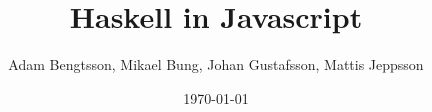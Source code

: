 \documentclass[a4paper, 12pt]{article}
\begin{document}
    \title{Haskell in Javascript}
    \author{Adam Bengtsson, Mikael Bung, Johan Gustafsson, Mattis Jeppsson}
    \date{\today}
    \maketitle
    \newpage

    \tableofcontents
    \newpage

    \newpage
    
    \newpage
    
    \newpage
    
    \newpage
    
    \newpage
    
    \newpage
    
    \newpage
    
    \newpage
    
    \newpage
    
    \newpage
    
    \newpage
    

    
     

    
\end{document}
